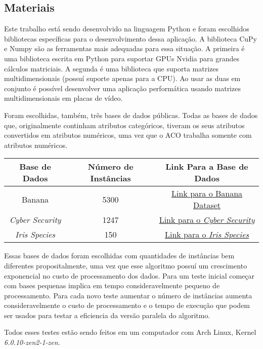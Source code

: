 \subsection{Materiais}

Este trabalho está sendo desenvolvido na linguagem Python e foram escolhidos bibliotecas 
específicas para o desenvolvimento dessa aplicação.
A biblioteca CuPy\cite{cupyLib} e Numpy\cite{numpyLib} são as ferramentas mais adequadas
para essa situação. A primeira é uma biblioteca escrita em Python para suportar GPUs Nvidia
para grandes cálculos matriciais. A segunda é uma biblioteca que suporta matrizes multidimensionais
(possuí suporte apenas para a CPU). Ao usar as duas em conjunto é possível desenvolver uma aplicação
performática usando matrizes multidimensionais em placas de vídeo.

Foram escolhidas, também, três bases de dados públicas.
Todas as bases de dados que, originalmente continham atributos categóricos, tiveram os
seus atributos convertidos em atributos numéricos, uma vez que o ACO trabalha
somente com atributos numéricos.

\begin{center}
    \begin{tabular}{|c|c|c|}   
        \hline
        Base de Dados & Número de Instâncias & Link Para a Base de Dados \\
        \hline
        Banana & 5300 & \href{https://www.kaggle.com/datasets/saranchandar/standard-classification-banana-dataset}{Link para o Banana Dataset} \\
        \hline
        \emph{Cyber Security} & 1247 & \href{https://www.kaggle.com/datasets/deepcontractor/cyber-security-salaries}{Link para o \emph{Cyber Security}} \\
        \hline
        \emph{Iris Species} & 150 & \href{https://www.kaggle.com/datasets/uciml/iris}{Link para o \emph{Iris Species}} \\
        \hline 
    \end{tabular}
\end{center}

Essas bases de dados foram escolhidas com quantidades de instâncias bem diferentes propositalmente, uma vez
que esse algoritmo possuí um crescimento exponencial no custo de processamento dos dados. Para um teste inicial
começar com bases pequenas implica em tempo consideravelmente pequeno de processamento. Para cada novo teste
aumentar o número de instâncias aumenta consideravelmente o custo de processamento e o tempo de execução que 
podem ser usados para testar a eficiencia da versão paralela do algoritmo.

Todos esses testes estão sendo feitos em um computador com Arch Linux, Kernel \emph{6.0.10-zen2-1-zen}. 
